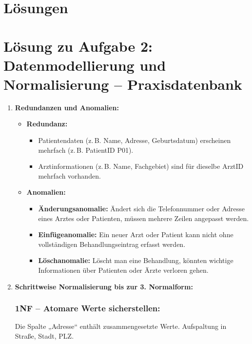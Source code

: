 \documentclass[a4paper,12pt]{article}
\begin{document}
	
	
	\newpage
	\section*{Lösungen}
	

	
	\vspace{2em}
	
\section*{Lösung zu Aufgabe 2: Datenmodellierung und Normalisierung – Praxisdatenbank}

\begin{enumerate}
	\item \textbf{Redundanzen und Anomalien:}
	
	\begin{itemize}
		\item \textbf{Redundanz:}
		\begin{itemize}
			\item Patientendaten (z.\,B. Name, Adresse, Geburtsdatum) erscheinen mehrfach (z.\,B. PatientID P01).
			\item Arztinformationen (z.\,B. Name, Fachgebiet) sind für dieselbe ArztID mehrfach vorhanden.
		\end{itemize}
		
		\item \textbf{Anomalien:}
		\begin{itemize}
			\item \textbf{Änderungsanomalie:} Ändert sich die Telefonnummer oder Adresse eines Arztes oder Patienten, müssen mehrere Zeilen angepasst werden.
			\item \textbf{Einfügeanomalie:} Ein neuer Arzt oder Patient kann nicht ohne vollständigen Behandlungseintrag erfasst werden.
			\item \textbf{Löschanomalie:} Löscht man eine Behandlung, könnten wichtige Informationen über Patienten oder Ärzte verloren gehen.
		\end{itemize}
	\end{itemize}
	
	\vspace{1em}
	
	\item \textbf{Schrittweise Normalisierung bis zur 3. Normalform:}
	
	\subsubsection*{1NF – Atomare Werte sicherstellen:}
	Die Spalte „Adresse“ enthält zusammengesetzte Werte. \textrightarrow{} Aufspaltung in Straße, Stadt, PLZ.
	

\end{enumerate}
\end{document}
